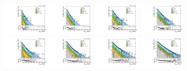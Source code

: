 \begin{figure}[htbp]
  \centering
  \includegraphics[width=0.2\textwidth]{fig/analysis/slopesSB_b1_allL_HP_bb_LDy_Run2_mWV_1OverX.pdf}
  \includegraphics[width=0.2\textwidth]{fig/analysis/slopesSB_b1_allL_LP_bb_LDy_Run2_mWV_1OverX.pdf}
  \includegraphics[width=0.2\textwidth]{fig/analysis/slopesSB_b1_allL_HP_bb_HDy_Run2_mWV_1OverX.pdf}
  \includegraphics[width=0.2\textwidth]{fig/analysis/slopesSB_b1_allL_LP_bb_HDy_Run2_mWV_1OverX.pdf}\\
  \includegraphics[width=0.2\textwidth]{fig/analysis/slopesSB_b1_allL_HP_nobb_LDy_Run2_mWV_1OverX.pdf}
  \includegraphics[width=0.2\textwidth]{fig/analysis/slopesSB_b1_allL_LP_nobb_LDy_Run2_mWV_1OverX.pdf}
  \includegraphics[width=0.2\textwidth]{fig/analysis/slopesSB_b1_allL_HP_nobb_HDy_Run2_mWV_1OverX.pdf}
  \includegraphics[width=0.2\textwidth]{fig/analysis/slopesSB_b1_allL_LP_nobb_HDy_Run2_mWV_1OverX.pdf}\\

\end{figure}
